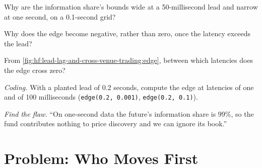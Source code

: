 \begin{exercise}[$\star\star$]\label{exo:hf:lead-lag-and-cross-venue-trading:4}
Why are the information share's bounds wide at a 50-millisecond lead and narrow at one second, on a 0.1-second grid?
\end{exercise}

\begin{exercise}[$\star\star$]\label{exo:hf:lead-lag-and-cross-venue-trading:5}
Why does the edge become negative, rather than zero, once the latency exceeds the lead?
\end{exercise}

\begin{exercise}[$\star\star$]\label{exo:hf:lead-lag-and-cross-venue-trading:6}
From \cref{fig:hf:lead-lag-and-cross-venue-trading:edge}, between which latencies does the edge cross zero?
\end{exercise}

\begin{exercise}[$\star\star\star$]\label{exo:hf:lead-lag-and-cross-venue-trading:7}
\emph{Coding.} With a planted lead of 0.2 seconds, compute the edge at latencies of one and of 100 milliseconds (\texttt{edge(0.2, 0.001)},
\texttt{edge(0.2, 0.1)}).
\end{exercise}

\begin{exercise}[$\star\star\star$]\label{exo:hf:lead-lag-and-cross-venue-trading:8}
\emph{Find the flaw.} ``On one-second data the future's information share is 99\%, so the fund contributes nothing to price discovery and we can
ignore its book.''
\end{exercise}

\section{Problem: Who Moves First}

